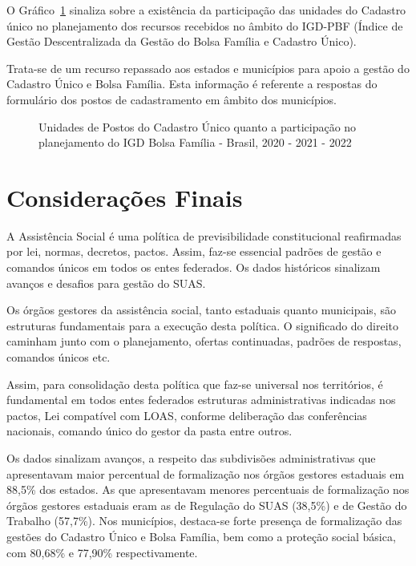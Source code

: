 \documentclass[
  letterpaper,
  DIV=11,
  numbers=noendperiod]{scrreprt}
\begin{document}
O Gráfico~\ref{fig-igdbolsa} sinaliza sobre a existência da participação
das unidades do Cadastro único no planejamento dos recursos recebidos no
âmbito do IGD-PBF (Índice de Gestão Descentralizada da Gestão do Bolsa
Família e Cadastro Único).

Trata-se de um recurso repassado aos estados e municípios para apoio a
gestão do Cadastro Único e Bolsa Família. Esta informação é referente a
respostas do formulário dos postos de cadastramento em âmbito dos
municípios.

\begin{figure}


\caption{\label{fig-igdbolsa}Unidades de Postos do Cadastro Único quanto
a participação no planejamento do IGD Bolsa Família - Brasil, 2020 -
2021 - 2022}

\end{figure}%

\section{Considerações Finais}\label{considerauxe7uxf5es-finais}

A Assistência Social é uma política de previsibilidade constitucional
reafirmadas por lei, normas, decretos, pactos. Assim, faz-se essencial
padrões de gestão e comandos únicos em todos os entes federados. Os
dados históricos sinalizam avanços e desafios para gestão do SUAS.

Os órgãos gestores da assistência social, tanto estaduais quanto
municipais, são estruturas fundamentais para a execução desta política.
O significado do direito caminham junto com o planejamento, ofertas
continuadas, padrões de respostas, comandos únicos etc.

Assim, para consolidação desta política que faz-se universal nos
territórios, é fundamental em todos entes federados estruturas
administrativas indicadas nos pactos, Lei compatível com LOAS, conforme
deliberação das conferências nacionais, comando único do gestor da pasta
entre outros.

Os dados sinalizam avanços, a respeito das subdivisões administrativas
que apresentavam maior percentual de formalização nos órgãos gestores
estaduais em 88,5\% dos estados. As que apresentavam menores percentuais
de formalização nos órgãos gestores estaduais eram as de Regulação do
SUAS (38,5\%) e de Gestão do Trabalho (57,7\%). Nos municípios,
destaca-se forte presença de formalização das gestões do Cadastro Único
e Bolsa Família, bem como a proteção social básica, com 80,68\% e
77,90\% respectivamente.
\end{document}
